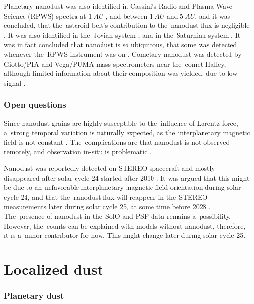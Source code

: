 Planetary nanodust was also identified in Cassini's Radio and Plasma Wave Science ({RPWS}) spectra 
at $\SI{1}{AU}$ \citep{schippers2014nanodust}, and between $\SI{1}{AU}$ and $\SI{5}{AU}$, and it was concluded, that the~asteroid belt's contribution to the~nanodust flux is negligible \citep{schippers2015nanodust}. It was also identified in the~Jovian system \citep{meyer2009detecting}, and in the~Saturnian system \citep{kempf2005high}. It was in fact concluded that nanodust is so ubiquitous, that some was detected whenever the~RPWS instrument was on \citep{schippers2015nanodust}. Cometary nanodust was detected by Giotto/PIA and Vega/PUMA mass spectrometers near the~comet Halley, although limited information about their composition was yielded, due to low signal \citep{utterback1990attogram}.

\subsubsection{Open questions}

Since nanodust grains are highly susceptible to the~influence of Lorentz force, a~strong temporal variation is naturally expected, as the~interplanetary magnetic field is not constant \citep{poppe2020effects}. The~complications are that nanodust is not observed remotely, and observation in-situ is problematic \citep{pantellini2012nano,kellogg2016dust,kellogg2017note}. 

Nanodust was reportedly detected on STEREO spacecraft \citep{meyer2009dust} and mostly disappeared after solar cycle 24 started after 2010 \citep{zaslavsky2012interplanetary}. It was argued that this might be due to an unfavorable interplanetary magnetic field orientation during solar cycle 24, and that the~nanodust flux will reappear in the~STEREO measurements later during solar cycle 25, at some time before 2028 \citep{poppe2022effects}. The~presence of nanodust in the~SolO and PSP data remains a~possibility. However, the~counts can be explained with models without nanodust, therefore, it is a~minor contributor for now. This might change later during solar cycle 25. 

\section{Localized dust}

\subsubsection{Planetary dust}

